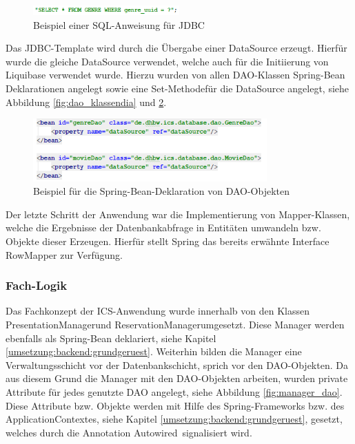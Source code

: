 	\begin{figure}[H]
		\centering 
		\includegraphics[width=0.5\textwidth]{img/select_beispiel}
		\captionsetup{format=hang}
		\caption[Beispiel einer SQL-Anweisung für \ac{JDBC}]{\label{fig:select_beispiel}Beispiel einer SQL-Anweisung für \ac{JDBC}}
	\end{figure}
	
	Das \ac{JDBC}-Template wird durch die Übergabe einer DataSource erzeugt. Hierfür wurde die gleiche DataSource verwendet, welche auch für die Initiierung von Liquibase verwendet wurde. Hierzu wurden von allen  \ac{DAO}-Klassen Spring-Bean Deklarationen angelegt sowie eine \glqq Set-Methode\grqq für die DataSource angelegt, siehe Abbildung \ref{fig:dao_klassendia} und \ref{fig:dao_spring}.
	
	\begin{figure}[H]
		\centering 
		\includegraphics[width=0.8\textwidth]{img/dao_spring}
		\captionsetup{format=hang}
		\caption[Beispiel für die Spring-Bean-Deklaration von \ac{DAO}-Objekten]{\label{fig:dao_spring}Beispiel für die Spring-Bean-Deklaration von \ac{DAO}-Objekten}
	\end{figure}	
	
	Der letzte Schritt der Anwendung war die Implementierung von Mapper-Klassen, welche die Ergebnisse der Datenbankabfrage in Entitäten umwandeln bzw. Objekte dieser Erzeugen. Hierfür stellt Spring das bereits erwähnte Interface RowMapper zur Verfügung. 
	
	\subsubsection{Fach-Logik}
	
	Das Fachkonzept der \ac{ICS}-Anwendung wurde innerhalb von den Klassen \glqq PresentationManager\grqq und \glqq ReservationManager\grqq umgesetzt. Diese Manager werden ebenfalls als Spring-Bean deklariert, siehe Kapitel \ref{umsetzung:backend:grundgeruest}. Weiterhin bilden die Manager eine Verwaltungsschicht vor der Datenbankschicht, sprich vor den \ac{DAO}-Objekten. Da aus diesem Grund die Manager mit den \ac{DAO}-Objekten arbeiten, wurden private Attribute für jedes genutzte \ac{DAO} angelegt, siehe Abbildung \ref{fig:manager_dao}. Diese Attribute bzw. Objekte werden mit Hilfe des Spring-Frameworks bzw. des ApplicationContextes, siehe Kapitel \ref{umsetzung:backend:grundgeruest}, gesetzt, welches durch die Annotation \glqq Autowired\grqq \, signalisiert wird. 
	
